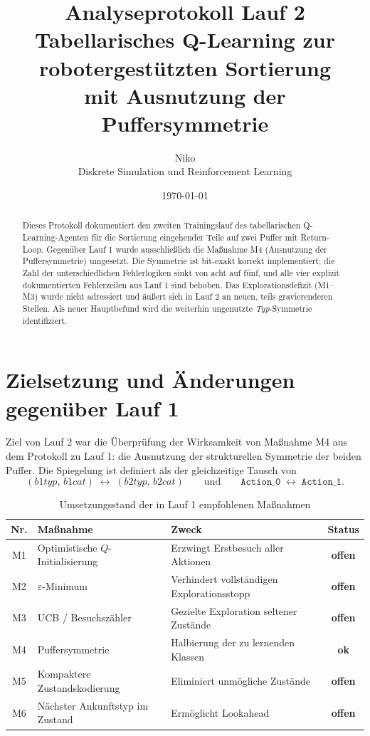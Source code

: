 \documentclass[11pt,a4paper]{article}
\title{\textbf{Analyseprotokoll Lauf 2}\\[0.35em]
\large Tabellarisches Q-Learning zur robotergestützten Sortierung\\
\large mit Ausnutzung der Puffersymmetrie}
\author{Niko \\ \small Diskrete Simulation und Reinforcement Learning}
\date{\today}
\newcommand{\ok}{\textcolor{green!55!black}{\textbf{ok}}}
\newcommand{\offen}{\textcolor{orange!85!black}{\textbf{offen}}}
\begin{document}
\maketitle
\thispagestyle{fancy}

\begin{abstract}
\noindent
Dieses Protokoll dokumentiert den zweiten Trainingslauf des tabellarischen
Q-Learning-Agenten für die Sortierung eingehender Teile auf zwei Puffer mit
Return-Loop. Gegenüber Lauf 1 wurde ausschließlich die Maßnahme M4
(Ausnutzung der Puffersymmetrie) umgesetzt. Die Symmetrie ist bit-exakt
korrekt implementiert; die Zahl der unterschiedlichen Fehlerlogiken sinkt von
acht auf fünf, und alle vier explizit dokumentierten Fehlerzeilen aus Lauf 1
sind behoben. Das Explorationsdefizit (M1--M3) wurde nicht adressiert und
äußert sich in Lauf 2 an neuen, teils gravierenderen Stellen. Als neuer
Hauptbefund wird die weiterhin ungenutzte \emph{Typ}-Symmetrie
identifiziert.
\end{abstract}

\tableofcontents
\bigskip

\section{Zielsetzung und Änderungen gegenüber Lauf 1}

Ziel von Lauf 2 war die Überprüfung der Wirksamkeit von Maßnahme M4 aus dem
Protokoll zu Lauf 1: die Ausnutzung der strukturellen Symmetrie der beiden
Puffer. Die Spiegelung ist definiert als der gleichzeitige Tausch von
\[
  (b1typ,\,b1cat) \;\longleftrightarrow\; (b2typ,\,b2cat)
  \qquad\text{und}\qquad
  \texttt{Action\_0} \;\longleftrightarrow\; \texttt{Action\_1}.
\]

\begin{table}[htbp]
\centering
\caption{Umsetzungsstand der in Lauf 1 empfohlenen Maßnahmen}
\label{tab:massnahmen-status}
\begin{tabularx}{\textwidth}{@{}clLc@{}}
\toprule
\textbf{Nr.} & \textbf{Maßnahme} & \textbf{Zweck} & \textbf{Status} \\
\midrule
M1 & Optimistische $Q$-Initialisierung & Erzwingt Erstbesuch aller Aktionen & \offen \\
M2 & $\varepsilon$-Minimum & Verhindert vollständigen Explorationsstopp & \offen \\
M3 & UCB / Besuchszähler & Gezielte Exploration seltener Zustände & \offen \\
M4 & Puffersymmetrie & Halbierung der zu lernenden Klassen & \ok \\
M5 & Kompaktere Zustandskodierung & Eliminiert unmögliche Zustände & \offen \\
M6 & Nächster Ankunftstyp im Zustand & Ermöglicht Lookahead & \offen \\
\bottomrule
\end{tabularx}
\end{table}
\end{document}
